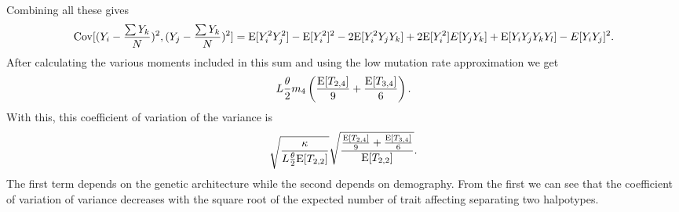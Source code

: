 Combining all these gives 
\begin{equation}
  \mathrm{Cov}[(Y_i - \frac{\sum Y_k}{N})^2, (Y_j - \frac{\sum Y_k}{N})^2] = 
  \mathrm{E}[Y_i^2Y_j^2] - \mathrm{E}[Y_i^2]^2 - 2\mathrm{E}[Y_i^2Y_jY_k] + 2\mathrm{E}[Y_i^2]E[Y_jY_k] +
  \mathrm{E}[Y_iY_jY_kY_l] - E[Y_iY_j]^2.
\end{equation}
After calculating the various moments included in this sum and using the low
mutation rate approximation we get
\begin{equation}
  L \frac{\theta}{2} m_4 \left( \frac{\mathrm{E}[T_{2,4}]}{9} + \frac{\mathrm{E}[T_{3,4}]}{6} \right).
  \label{eq:exppopvarvar}
\end{equation}
With this, this coefficient of variation of the variance is
\begin{equation}
  \sqrt{\frac{\kappa}{L \frac{\theta}{2} \mathrm{E}[T_{2,2}]}} \sqrt{\frac{\frac{\mathrm{E}[T_{2,4}]}{9} + \frac{\mathrm{E}[T_{3,4}]}{6}}{\mathrm{E}[T_{2,2}]}}.
\end{equation}
The first term depends on the genetic architecture while the second depends on
demography. From the first we can see that the coefficient of variation of
variance decreases with the square root of the expected number of trait
affecting separating two halpotypes. 

